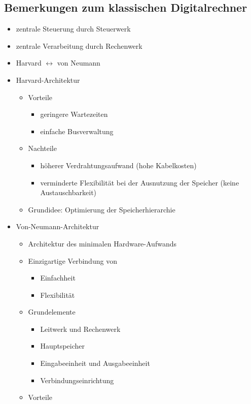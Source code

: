 \subsection{Bemerkungen zum klassischen Digitalrechner}
\begin{itemize}
	\item zentrale Steuerung durch Steuerwerk
	\item zentrale Verarbeitung durch Rechenwerk
	\item Harvard \(\leftrightarrow\) von Neumann
	\item Harvard-Architektur
	\begin{itemize}
		\item Vorteile
		\begin{itemize}
			\item geringere Wartezeiten
			\item einfache Busverwaltung
		\end{itemize}
		\item Nachteile
		\begin{itemize}
			\item höherer Verdrahtungsaufwand (hohe Kabelkosten)
			\item verminderte Flexibilität bei der Ausnutzung der Speicher (keine Austauschbarkeit)
		\end{itemize}
		\item Grundidee: Optimierung der Speicherhierarchie
	\end{itemize}
	\item Von-Neumann-Architektur
	\begin{itemize}
		\item Architektur des minimalen Hardware-Aufwands
		\item Einzigartige Verbindung von
		\begin{itemize}
			\item Einfachheit
			\item Flexibilität
		\end{itemize}
		\item Grundelemente
		\begin{itemize}
			\item Leitwerk und Rechenwerk
			\item Hauptspeicher
			\item Eingabeeinheit und Ausgabeeinheit
			\item Verbindungseinrichtung
		\end{itemize}
		\item Vorteile
		\begin{itemize}

\end{itemize}
\end{itemize}
\end{itemize}
